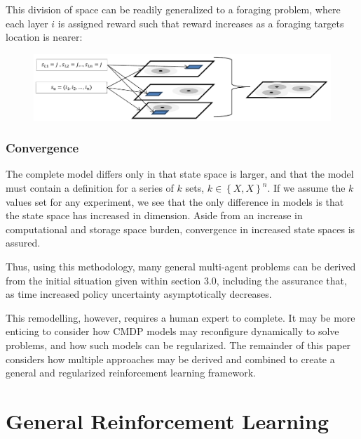 \documentclass[compsoc,journal,letterpaper,10pt,draftcls,twocolumn]{IEEEtran}
\begin{document}
This division of space can be readily generalized to a foraging problem,
where each layer \(i\) is assigned reward such that reward increases as
a foraging targets location is nearer:

\begin{figure}[!t]
\centering
\includegraphics[width=6in]{media/figure10}
\end{figure}

\subsubsection{}\label{section}

\subsubsection{Convergence}\label{convergence-2}

The complete model differs only in that state space is larger, and that
the model must contain a definition for a series of \(k\) sets,
\(k \in \left\{ X,X \right\}^{n}\). If we assume the \(k\) values set
for any experiment, we see that the only difference in models is that
the state space has increased in dimension. Aside from an increase in
computational and storage space burden, convergence in increased state
spaces is assured.

Thus, using this methodology, many general multi-agent problems can be
derived from the initial situation given within section 3.0, including
the assurance that, as time increased policy uncertainty asymptotically
decreases.

This remodelling, however, requires a human expert to complete. It may
be more enticing to consider how CMDP models may reconfigure dynamically
to solve problems, and how such models can be regularized. The remainder
of this paper considers how multiple approaches may be derived and
combined to create a general and regularized reinforcement learning
framework.

\section{General Reinforcement
Learning}\label{general-reinforcement-learning}
\end{document}
